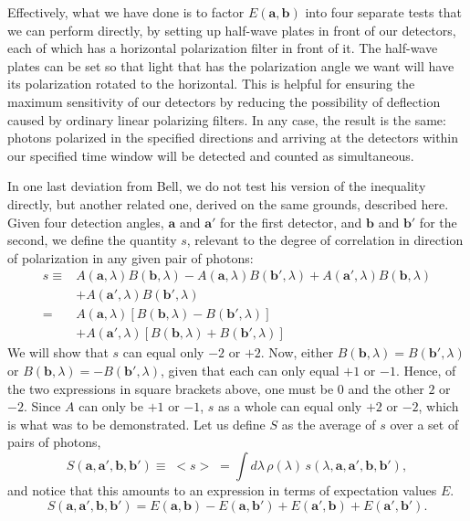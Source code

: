 Effectively, what we have done is to factor $E(\pmb{a},\pmb{b})$ into four separate tests that we can perform directly, by setting up half-wave plates
in front of our detectors, each of which has a horizontal polarization filter in front of it. The
half-wave plates can be set so that light that has the polarization angle we want will have its
polarization rotated to the horizontal. This is helpful for ensuring the maximum sensitivity of our detectors by reducing the possibility of deflection caused by ordinary linear polarizing filters. In any case, the result is the same: photons polarized in the specified directions and arriving at the detectors within our specified time window will be detected and counted as simultaneous.

In one last deviation from Bell, we do not test his version of the inequality directly, but another
related one, derived on the same grounds, described here. Given four detection angles, $\pmb{a}$ and $\pmb{a'}$ 
for the first detector, and $\pmb{b}$ and $\pmb{b'}$ for the second, we define the quantity $s$, relevant
to the degree of correlation in direction of polarization in any given pair of photons:
\begin{align*}\tag{R2}
s \equiv& A(\pmb{a},\lambda)B(\pmb{b},\lambda) - A(\pmb{a},\lambda)B(\pmb{b'},\lambda) + A(\pmb{a'},\lambda)B(\pmb{b},\lambda)\\ 
     &+ A(\pmb{a'},\lambda)B(\pmb{b'},\lambda)\\
  =& A(\pmb{a},\lambda)[B(\pmb{b},\lambda)-B(\pmb{b'},\lambda)]\\
  &+ A(\pmb{a'},\lambda)[B(\pmb{b},\lambda)+B(\pmb{b'},\lambda)] 
\end{align*}
We will show that $s$ can equal only $-2$ or $+2$. Now, either $B(\pmb{b},\lambda) = B(\pmb{b'},\lambda)$ or $B(\pmb{b},\lambda) = -B(\pmb{b'},\lambda)$, given that each can only equal $+1$ or $-1$. Hence, of the two expressions in square brackets above,
one must be $0$ and the other $2$ or $-2$. Since $A$ can only be $+1$ or $-1$, $s$ as a whole can equal only
$+2$ or $-2$, which is what was to be demonstrated. Let us define $S$ as the average of $s$ over a set of pairs
of photons,
\begin{equation*}
S(\pmb{a},\pmb{a'},\pmb{b},\pmb{b'}) \equiv \; <s> \; = \int d\lambda\, \rho(\lambda)\, s(\lambda,\pmb{a},\pmb{a'},\pmb{b},\pmb{b'}),
\end{equation*}
and notice that this amounts to an expression in terms of expectation values $E$.
\begin{equation*}\tag{R3}
 S(\pmb{a},\pmb{a'},\pmb{b},\pmb{b'}) = E(\pmb{a},\pmb{b}) - E(\pmb{a},\pmb{b'}) + E(\pmb{a'},\pmb{b}) + E(\pmb{a'},\pmb{b'}). 
\end{equation*}
